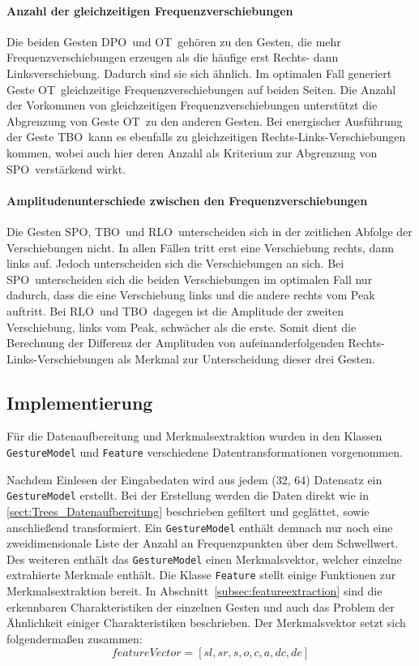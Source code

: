 \paragraph*{Anzahl der gleichzeitigen Frequenzverschiebungen}
Die beiden Gesten \glqq \acl{DPO}\grqq\ und \glqq \acl{OT}\grqq\ gehören zu den Gesten, die mehr Frequenzverschiebungen erzeugen als die häufige erst Rechts- dann Linksverschiebung. Dadurch sind sie sich ähnlich. Im optimalen Fall generiert Geste \glqq \acl{OT}\grqq\ gleichzeitige Frequenzverschiebungen auf beiden Seiten. Die Anzahl der Vorkommen von gleichzeitigen Frequenzverschiebungen unterstützt die Abgrenzung von Geste \glqq \acl{OT}\grqq\ zu den anderen Gesten. Bei energischer Ausführung der Geste \glqq \acl{TBO}\grqq\ kann es ebenfalls zu gleichzeitigen Rechts-Links-Verschiebungen kommen, wobei auch hier deren Anzahl als Kriterium zur Abgrenzung von \glqq \acl{SPO}\grqq\ verstärkend wirkt.

\paragraph*{Amplitudenunterschiede zwischen den Frequenzverschiebungen}
Die Gesten \glqq \acl{SPO}\grqq , \glqq \acl{TBO}\grqq\ und \glqq \acl{RLO}\grqq\ unterscheiden sich in der zeitlichen Abfolge der Verschiebungen nicht. In allen Fällen tritt erst eine Verschiebung rechts, dann links auf. Jedoch unterscheiden sich die Verschiebungen an sich. Bei \glqq \acl{SPO}\grqq\ unterscheiden sich die beiden Verschiebungen im optimalen Fall nur dadurch, dass die eine Verschiebung links und die andere rechts vom Peak auftritt. Bei \glqq \acl{RLO}\grqq\ und \glqq \acl{TBO}\grqq\ dagegen ist die Amplitude der zweiten Verschiebung, links vom Peak, schwächer als die erste. Somit dient die Berechnung der Differenz der Amplituden von aufeinanderfolgenden Rechts-Links-Verschiebungen als Merkmal zur Unterscheidung dieser drei Gesten.


\subsection{Implementierung}

Für die Datenaufbereitung und Merkmalsextraktion wurden in den Klassen \texttt{GestureModel} und \texttt{Feature} verschiedene Datentransformationen vorgenommen. 

Nachdem Einlesen der Eingabedaten wird aus jedem (32, 64) Datensatz ein \texttt{GestureModel} erstellt. Bei der Erstellung werden die Daten direkt wie in \autoref{sect:Trees_Datenaufbereitung} beschrieben gefiltert und geglättet, sowie anschließend transformiert. Ein \texttt{GestureModel} enthält demnach nur noch eine zweidimensionale Liste der Anzahl an Frequenzpunkten über dem Schwellwert. Des weiteren enthält das \texttt{GestureModel} einen Merkmalsvektor, welcher einzelne extrahierte Merkmale enthält. Die Klasse \texttt{Feature} stellt einige Funktionen zur Merkmalsextraktion bereit. In Abschnitt~\ref{subsec:featureextraction} sind die erkennbaren Charakteristiken der einzelnen Gesten und auch das Problem der Ähnlichkeit einiger Charakteristiken beschrieben. 
Der Merkmalsvektor setzt sich folgendermaßen zusammen:
$$ featureVector = [sl, sr, s, o, c, a, dc, de] $$

